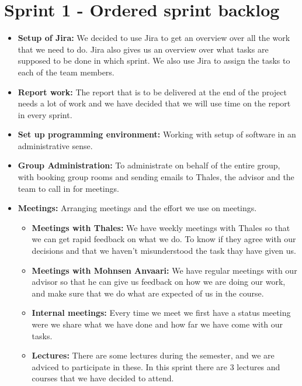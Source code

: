 \section{Sprint 1 - Ordered sprint backlog}

\begin{itemize}
\item{}\textbf{Setup of Jira:} We decided to use Jira to get an overview over all the work that we need to do. Jira also gives us an overview over what tasks are supposed to be done in which sprint. We also use Jira to assign the tasks to each of the team members.
\item{}\textbf{Report work:} The report that is to be delivered at the end of the project needs a lot of work and we have decided that we will use time on the report in every sprint.
\item{}\textbf{Set up programming environment:} Working with setup of software in an administrative sense.
\item{}\textbf{Group Administration:} To administrate on behalf of the entire group, with booking group rooms and sending emails to Thales, the advisor and the team to call in for meetings.
\item{}\textbf{Meetings:} Arranging meetings and the effort we use on meetings.
\begin{itemize}
\item{}\textbf{Meetings with Thales:} We have weekly meetings with Thales so that we can get rapid feedback on what we do. To know if they agree with our decisions and that we haven't misunderstood the task thay have given us.
\item{}\textbf{Meetings with Mohnsen Anvaari:} We have regular meetings with our advisor so that he can give us feedback on how we are doing our work, and make sure that we do what are expected of us in the course.
\item{}\textbf{Internal meetings:} Every time we meet we first have a status meeting were we share what we have done and how far we have come with our tasks.
\item{}\textbf{Lectures:} There are some lectures during the semester, and we are adviced to participate in these. In this sprint there are 3 lectures and courses that we have decided to attend.
\end{itemize}

\newpage


\end{itemize}
